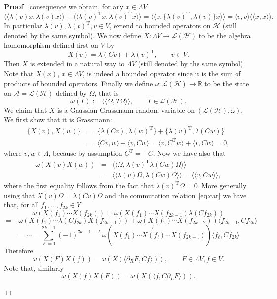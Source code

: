 \documentclass{article}
\newcommand{\Tau}{\mathrm{T}}
\newcommand{\assign}{:=}
\newcommand{\llangle}{{\langle\!\langle}}
\newcommand{\rrangle}{{\rangle\!\rangle}}
\newenvironment{proof}{\noindent\textbf{Proof\ }}{\hspace*{\fill}$\Box$\medskip}
\begin{document}
\begin{proof}
  consequence we obtain, for any $x \in \Lambda V$
  \[ \llangle \lambda (v) x, \lambda (v) x \rrangle + \llangle \lambda
     (v)^{\Tau} x, \lambda (v)^{\Tau} x \rrangle = \llangle x, \{ \lambda
     (v)^{\Tau}, \lambda (v) \} x \rrangle = \langle v, v \rangle \llangle x,
     x \rrangle . \]
  In particular $\lambda (v), \lambda (v)^{\Tau}, v \in V$, extend to bounded
  operators on $\mathcal{H}$ (still denoted by the same symbol). We now define
  $X : \Lambda V \rightarrow \mathcal{L} (\mathcal{H})$ to be the algebra
  homomorphism defined first on $V$ by
  \[ X (v) = \lambda (C v) + \lambda (v)^{\Tau}, \qquad v \in V. \]
  Then $X$ is extended in a natural way to $\Lambda V$ (still denoted by the
  same symbol). Note that $X (x)$, $x \in \Lambda V$, is indeed a bounded
  operator since it is the sum of products of bounded operators. Finally we
  define $\omega : \mathcal{L} (\mathcal{H}) \rightarrow \mathbb{R}$ to be the
  state on $\mathcal{A} =\mathcal{L} (\mathcal{H})$ defined by $\Omega$, that
  is
  \[ \omega (T) \assign \llangle \Omega, T \Omega \rrangle, \qquad T \in
     \mathcal{L} (\mathcal{H}) . \]
  We claim that $X$ is a Gaussian Grassmann random variable on $(\mathcal{L}
  (\mathcal{H}), \omega)$. We first show that it is Grassmann:
  \[ \begin{array}{lll}
       \{ X (v), X (w) \} & = & \{ \lambda (C v), \lambda (w)^{\Tau} \} + \{
       \lambda (v)^{\Tau}, \lambda (C w) \}\\
       & = & \langle C v, w \rangle + \langle v, C w \rangle = \langle v,
       C^{\Tau} w \rangle + \langle v, C w \rangle = 0,
     \end{array} \]
  where $v, w \in \Lambda$, because by assumption $C^{\Tau} = - C$. Now we
  have also that
  \begin{eqnarray*}
    \omega (X (v) X (w)) & = & \llangle \Omega,^{} \lambda (v)^{\Tau} \lambda
    (C w) \Omega \rrangle\\
    & = & \llangle \lambda (v) \Omega, \lambda (C w) \Omega \rrangle =
    \llangle v, C w \rrangle,
  \end{eqnarray*}
  where the first equality follows from the fact that $\lambda (v)^{\Tau}
  \Omega = 0$. More generally using that $X (v) \Omega = \lambda (C v) \Omega$
  and the commutation relation~{\eqref{eq:car}} we have that, for all $f_1,
  \ldots, f_{2 k} \in V$
  \[ \omega (X (f_1) \cdots X (f_{2 k})) = \omega (X (f_1) \cdots X (f_{2 k -
     1}) \lambda (C f_{2 k})) \]
  \[ = - \omega (X (f_1) \cdots \lambda (C f_{2 k}) X (f_{2 k - 1})) + \omega
     (X (f_1) \cdots X (f_{2 k - 2})) \langle f_{2 k - 1}, C f_{2 k} \rangle
  \]
  \[ = \cdots = \sum_{\ell = 1}^{2 k - 1} (- 1)^{2 k - 1 - \ell} \omega \left(
     X (f_1) \cdots \not{X (f_{\ell})} \cdots X (f_{2 k - 1}) \right) \langle
     f_{\ell}, C f_{2 k} \rangle \]
  Therefore
  \[ \omega (X (F) X (f)) = \omega (X (\langle \partial_R F, C f \rangle)),
     \qquad F \in \Lambda V, f \in V. \]
  Note that, similarly
  \begin{equation}
    \omega (X (f) X (F)) = \omega (X (\langle f, C \partial_L F \rangle)) .
    \label{eq:ibp-l}
  \end{equation}
  
\end{proof}
\end{document}
